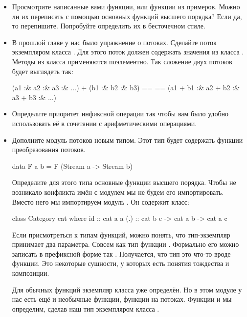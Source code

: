 \begin{itemize}

\item Просмотрите написанные вами функции, или функции
        из примеров. Можно ли их переписать с помощью
        основных функций высшего порядка? 
        Если да, то перепишите. Попробуйте определить
        их в бесточечном стиле.



\item В прошлой главе у нас было упражнение о потоках.
        Сделайте поток экземпляром класса .
        Для этого поток должен содержать значения из класса .
        Методы из класса  применяются поэлементно.
        Так сложение двух потоков будет выглядеть так:

\begin{code}
    (a1 :& a2 :& a3 :& ...) + (b1 :& b2 :& b3) ==
==  (a1 + b1 :& a2 + b2 :& a3 + b3 :& ...)
\end{code}


\item Определите приоритет инфиксной операции \In{(:&)}  
        так чтобы вам было удобно использовать её в сочетании
        с арифметическими операциями.

\item Дополните модуль потоков новым типом. Этот
      тип будет содержать функции преобразования
      потоков.

\begin{code}
data F a b = F (Stream a -> Stream b)
\end{code}

Определите для этого типа основные функции высшего порядка.
Чтобы не возникало конфликта имён с модулем 
мы не будем его импортировать. Вместо него мы импортируем
модуль . Он содержит класс:

\begin{code}
class Category cat where
        id  :: cat a a
        (.) :: cat b c -> cat a b -> cat a c
\end{code}

Если присмотреться к типам функций, можно понять,
что тип-экземпляр  принимает два параметра. 
Совсем как тип функции . Формально его можно записать
в префиксной форме так . Получается,
что тип  это что-то вроде функции. Это некоторые
сущности, у которых есть понятия тождества и композиции.

Для обычных функций экземпляр класса 
уже определён. Но в этом модуле у нас есть ещё и 
необычные функции, функции на потоках. Функции 
 и  мы определим, сделав наш тип 
экземпляром класса .


\end{itemize}
